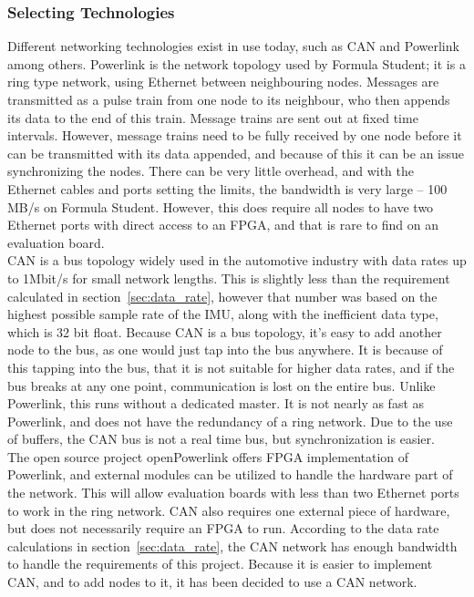 \subsubsection*{Selecting Technologies}
Different networking technologies exist in use today, such as CAN and Powerlink among others.
Powerlink is the network topology used by Formula Student; it is a ring type network, using Ethernet between neighbouring nodes.
Messages are transmitted as a pulse train from one node to its neighbour, who then appends its data to the end of this train. 
Message trains are sent out at fixed time intervals.
However, message trains need to be fully received by one node before it can be transmitted with its data appended, and because of this it can be an issue synchronizing the nodes.
There can be very little overhead, and with the Ethernet cables and ports setting the limits, the bandwidth is very large -- 100 MB/s on Formula Student.
However, this does require all nodes to have two Ethernet ports with direct access to an FPGA, and that is rare to find on an evaluation board.\\

CAN is a bus topology widely used in the automotive industry with data rates up to 1Mbit/s for small network lengths.
This is slightly less than the requirement calculated in section~\ref{sec:data_rate}, however that number was based on the highest possible sample rate of the IMU, along with the inefficient data type, which is 32 bit float.
Because CAN is a bus topology, it's easy to add another node to the bus, as one would just tap into the bus anywhere.
It is because of this tapping into the bus, that it is not suitable for higher data rates, and if the bus breaks at any one point, communication is lost on the entire bus.
Unlike Powerlink, this runs without a dedicated master.
It is not nearly as fast as Powerlink, and does not have the redundancy of a ring network.
Due to the use of buffers, the CAN bus is not a real time bus, but synchronization is easier.\\

The open source project openPowerlink offers FPGA implementation of Powerlink, and external modules can be utilized to handle the hardware part of the network.
This will allow evaluation boards with less than two Ethernet ports to work in the ring network. 
CAN also requires one external piece of hardware, but does not necessarily require an FPGA to run. 
According to the data rate calculations in section~\ref{sec:data_rate}, the CAN network has enough bandwidth to handle the requirements of this project. 
Because it is easier to implement CAN, and to add nodes to it, it has been decided to use a CAN network.
